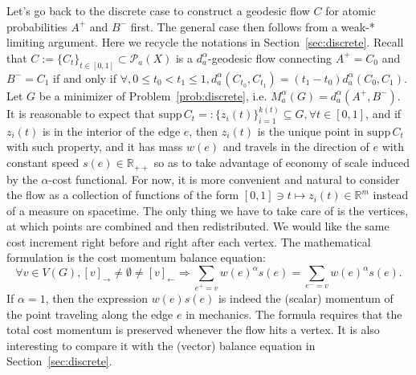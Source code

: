 \documentclass[fleqn]{article}
\theoremstyle{definition}
\theoremstyle{remark}
\renewcommand{\P}{\mathcal{P}} %
\newcommand{\supp}{\mathrm{supp}\,} %
\begin{document}
\par
Let's go back to the discrete case to construct a geodesic flow $C$ for atomic probabilities $A^+$ and $B^-$ first. The general case then follows from a weak-* limiting argument. Here we recycle the notations in Section~\ref{sec:discrete}. Recall that $C:=\{C_t\}_{t\in[0,1]} \subset \P_a(X)$ is a $d_a^\alpha$-geodesic flow connecting $A^+ =C_0$ and $B^- =C_1$ if and only if $\forall, 0\le t_0 < t_1 \le 1, d_a^\alpha(C_{t_0},C_{t_1})=(t_1-t_0) d_a^\alpha(C_0,C_1)$. Let $G$ be a minimizer of Problem~\ref{prob:discrete}, i.e. $M_a^\alpha(G)=d_a^\alpha(A^+,B^-)$. It is reasonable to expect that $\supp C_t =:\{z_i(t)\}_{i=1}^{k(t)} \subseteq G, \forall t\in[0,1]$, and if $z_i(t)$ is in the interior of the edge $e$, then $z_i(t)$ is the unique point in $\supp C_t$ with such property, and it has mass $w(e)$ and travels in the direction of $e$ with constant speed $s(e)\in\mathbb{R}_{++}$ so as to take advantage of economy of scale induced by the $\alpha$-cost functional. For now, it is more convenient and natural to consider the flow as a collection of functions of the form $[0,1]\ni t \mapsto z_i(t) \in\mathbb{R}^m$ instead of a measure on spacetime. The only thing we have to take care of is the vertices, at which points are combined and then redistributed. We would like the same cost increment right before and right after each vertex. The mathematical formulation is the cost momentum balance equation:
$$\forall v\in V(G), [v]_\rightarrow \ne \emptyset \ne [v]_\leftarrow \Rightarrow \sum_{e^+ =v}w(e)^\alpha s(e) = \sum_{e^- =v}w(e)^\alpha s(e).$$
If $\alpha=1$, then the expression $w(e)s(e)$ is indeed the (scalar) momentum of the point traveling along the edge $e$ in mechanics. The formula requires that the total cost momentum is preserved whenever the flow hits a vertex. It is also interesting to compare it with the (vector) balance equation in Section~\ref{sec:discrete}.
\par
\end{document}
